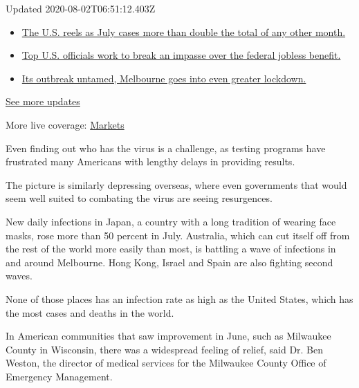 Updated 2020-08-02T06:51:12.403Z

\begin{itemize}
\tightlist
\item
  \href{https://www.nytimes.com/2020/08/01/world/coronavirus-covid-19.html?action=click\&pgtype=Article\&state=default\&region=MAIN_CONTENT_1\&context=storylines_live_updates\#link-34047410}{The
  U.S. reels as July cases more than double the total of any other
  month.}
\item
  \href{https://www.nytimes.com/2020/08/01/world/coronavirus-covid-19.html?action=click\&pgtype=Article\&state=default\&region=MAIN_CONTENT_1\&context=storylines_live_updates\#link-780ec966}{Top
  U.S. officials work to break an impasse over the federal jobless
  benefit.}
\item
  \href{https://www.nytimes.com/2020/08/01/world/coronavirus-covid-19.html?action=click\&pgtype=Article\&state=default\&region=MAIN_CONTENT_1\&context=storylines_live_updates\#link-2bc8948}{Its
  outbreak untamed, Melbourne goes into even greater lockdown.}
\end{itemize}

\href{https://www.nytimes.com/2020/08/01/world/coronavirus-covid-19.html?action=click\&pgtype=Article\&state=default\&region=MAIN_CONTENT_1\&context=storylines_live_updates}{See
more updates}

More live coverage:
\href{https://www.nytimes.com/live/2020/07/31/business/stock-market-today-coronavirus?action=click\&pgtype=Article\&state=default\&region=MAIN_CONTENT_1\&context=storylines_live_updates}{Markets}

Even finding out who has the virus is a challenge, as testing programs
have frustrated many Americans with lengthy delays in providing results.

The picture is similarly depressing overseas, where even governments
that would seem well suited to combating the virus are seeing
resurgences.

New daily infections in Japan, a country with a long tradition of
wearing face masks, rose more than 50 percent in July. Australia, which
can cut itself off from the rest of the world more easily than most, is
battling a wave of infections in and around Melbourne. Hong Kong, Israel
and Spain are also fighting second waves.

None of those places has an infection rate as high as the United States,
which has the most cases and deaths in the world.

In American communities that saw improvement in June, such as Milwaukee
County in Wisconsin, there was a widespread feeling of relief, said Dr.
Ben Weston, the director of medical services for the Milwaukee County
Office of Emergency Management.

